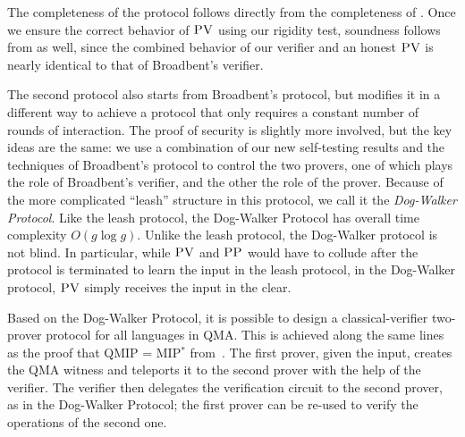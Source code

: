 \documentclass[11pt]{article}
\newcommand{\pv}{\textsc{PV}}
\newcommand{\pp}{\textsc{PP}}
\begin{document}
The completeness of the protocol follows directly from the completeness of \cite{broadbent15howtoverify}. Once we ensure the correct behavior of $\pv$ using our rigidity test, soundness follows from \cite{broadbent15howtoverify} as well, since the combined behavior of our verifier and an honest $\pv$ is nearly identical to that of Broadbent's verifier. 

The second protocol also starts from Broadbent's protocol, but modifies it in a
different way to achieve a protocol that only requires a constant number of rounds of
interaction. The proof of security is slightly more involved, but the key ideas are the same: we use a combination of our new self-testing results and the techniques of Broadbent's protocol to control the two provers, one of which plays the role of Broadbent's verifier, and the other the role of the prover. Because of the more complicated ``leash'' structure in this protocol, we call it the \emph{Dog-Walker Protocol}. 
 Like the leash protocol, the Dog-Walker Protocol has overall time complexity $O(g\log g)$. Unlike the leash protocol, the Dog-Walker protocol is not blind. In particular, while $\pv$ and $\pp$ would have to collude after the protocol is terminated to learn the input in the leash protocol, in the Dog-Walker protocol, $\pv$ simply receives the input in the clear.


Based on the Dog-Walker Protocol, it is possible to design a classical-verifier  two-prover protocol for all languages in QMA. This is achieved along the same lines as the proof that QMIP = MIP$^*$ from~\cite{reichardt2012classical}. The first prover, given the input, creates the QMA witness and teleports it to the second prover with the help of the verifier. The verifier then delegates the verification circuit to the second prover, as in the Dog-Walker Protocol; the first prover can be re-used to verify the operations of the second one.
\end{document}
